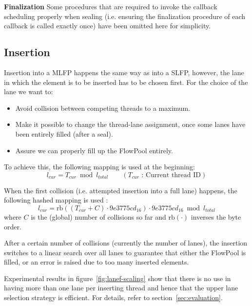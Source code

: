\documentclass[runningheads,a4paper,fleqn]{llncs}
\begin{document}
\textbf{Finalization} Some procedures that are required to invoke the
callback scheduling properly when sealing (i.e. ensuring the
finalization procedure of each callback is called exactly once) have
been omitted here for simplicity.

\subsection{Insertion}
Insertion into a MLFP happens the same way as into a SLFP, however,
the lane in which the element is to be inserted has to be chosen
first. For the choice of the lane we want to:
\begin{itemize}
\item Avoid collision between competing threads to a maximum.
\item Make it possible to change the thread-lane assignment, once some lanes have
  been entirely filled (after a seal).
\item Assure we can properly fill up the FlowPool entirely.
\end{itemize}
To achieve this, the following mapping is used at the beginning:
\[ l_{cur} = T_{cur} \bmod l_{total} \qquad
  (T_{cur} \text{ : Current thread ID}) \] 

When the first collision (i.e. attempted insertion into a full lane)
happens, the following hashed mapping is used \cite{BSH}:
\[ l_{cur} = \mathrm{rb}((T_{cur} + C) \cdot 9e3775cd_{16})
   \cdot 9e3775cd_{16}  \bmod l_{total} \]
where $C$ is the (global) number of collisions so far and
$\mathrm{rb}(\cdot)$ inverses the byte order.

After a certain number of collisions (currently the number of lanes),
the insertion switches to a linear search over all lanes to guarantee
that either the FlowPool is filled, or an error is raised due to too
many inserted elements.

Experimental results in figure~\ref{fig:lanef-scaling} show that there
is no use in having more than one lane per inserting thread and hence
that the upper lane selection strategy is efficient. For details,
refer to section~\ref{sec:evaluation}. 
\end{document}
